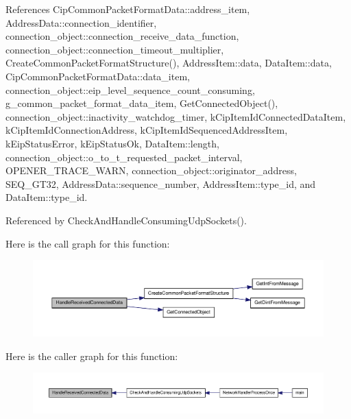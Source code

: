 \-References \-Cip\-Common\-Packet\-Format\-Data\-::address\-\_\-item, \-Address\-Data\-::connection\-\_\-identifier, connection\-\_\-object\-::connection\-\_\-receive\-\_\-data\-\_\-function, connection\-\_\-object\-::connection\-\_\-timeout\-\_\-multiplier, \-Create\-Common\-Packet\-Format\-Structure(), \-Address\-Item\-::data, \-Data\-Item\-::data, \-Cip\-Common\-Packet\-Format\-Data\-::data\-\_\-item, connection\-\_\-object\-::eip\-\_\-level\-\_\-sequence\-\_\-count\-\_\-consuming, g\-\_\-common\-\_\-packet\-\_\-format\-\_\-data\-\_\-item, \-Get\-Connected\-Object(), connection\-\_\-object\-::inactivity\-\_\-watchdog\-\_\-timer, k\-Cip\-Item\-Id\-Connected\-Data\-Item, k\-Cip\-Item\-Id\-Connection\-Address, k\-Cip\-Item\-Id\-Sequenced\-Address\-Item, k\-Eip\-Status\-Error, k\-Eip\-Status\-Ok, \-Data\-Item\-::length, connection\-\_\-object\-::o\-\_\-to\-\_\-t\-\_\-requested\-\_\-packet\-\_\-interval, \-O\-P\-E\-N\-E\-R\-\_\-\-T\-R\-A\-C\-E\-\_\-\-W\-A\-R\-N, connection\-\_\-object\-::originator\-\_\-address, \-S\-E\-Q\-\_\-\-G\-T32, \-Address\-Data\-::sequence\-\_\-number, \-Address\-Item\-::type\-\_\-id, and \-Data\-Item\-::type\-\_\-id.



\-Referenced by \-Check\-And\-Handle\-Consuming\-Udp\-Sockets().



\-Here is the call graph for this function\-:
\nopagebreak
\begin{figure}[H]
\begin{center}
\leavevmode
\includegraphics[width=350pt]{d2/dc9/group__CIP__API_ga34f1582ed424a2c875b8a317d828e181_cgraph}
\end{center}
\end{figure}




\-Here is the caller graph for this function\-:
\nopagebreak
\begin{figure}[H]
\begin{center}
\leavevmode
\includegraphics[width=350pt]{d2/dc9/group__CIP__API_ga34f1582ed424a2c875b8a317d828e181_icgraph}
\end{center}
\end{figure}


